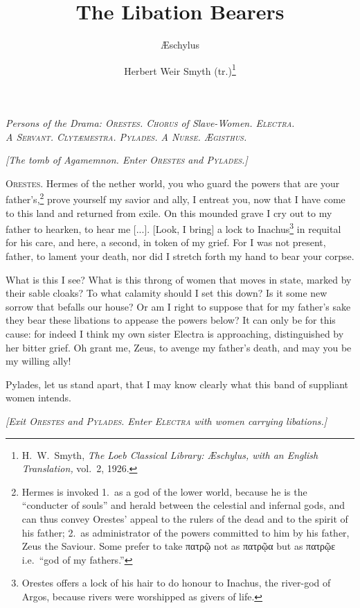 \documentclass[12pt]{article}
\title{The Libation Bearers}
\author{{\AE}schylus \and Herbert Weir Smyth (tr.)\footnote{H.~W.~Smyth, \textit{The Loeb Classical Library: {\AE}schylus, with an English Translation,} vol.~2, 1926.}}
\date{}
\begin{document}
\maketitle

\begin{center}
\textit{Persons of the Drama: \textsc{Orestes. Chorus} of Slave-Women. \textsc{Electra.}\\
A \textsc{Servant. Clyt{\ae}mestra. Pylades.} A \textsc{Nurse. {\AE}gisthus.}}
\end{center}

\begin{center}
\textit{[The tomb of Agamemnon. Enter \textsc{Orestes} and \textsc{Pylades}.]}
\end{center}

\noindent \textsc{Orestes.} Hermes of the nether world, you who guard the powers that are your father's,\footnote{Hermes is invoked 1.~as a god of the lower world, because he is the ``conducter of souls'' and herald between the celestial and infernal gods, and can thus convey Orestes' appeal to the rulers of the dead and to the spirit of his father; 2.~as administrator of the powers committed to him by his father, Zeus the Saviour. Some prefer to take πατρῷ not as πατρῷα but as πατρῷε i.e.~``god of my fathers.''} prove yourself my savior and ally, I entreat you, now that I have come to this land and returned from exile. On this mounded grave I cry out to my father to hearken, to hear me [...]. [Look, I bring] a lock to Inachus\footnote{Orestes offers a lock of his hair to do honour to Inachus, the river-god of Argos, because rivers were worshipped as givers of life.} in requital for his care, and here, a second, in token of my grief. For I was not present, father, to lament your death, nor did I stretch forth my hand to bear your corpse.

What is this I see? What is this throng of women that moves in state, marked by their sable cloaks? To what calamity should I set this down? Is it some new sorrow that befalls our house? Or am I right to suppose that for my father's sake they bear these libations to appease the powers below? It can only be for this cause: for indeed I think my own sister Electra is approaching, distinguished by her bitter grief. Oh grant me, Zeus, to avenge my father's death, and may you be my willing ally!

Pylades, let us stand apart, that I may know clearly what this band of suppliant women intends.

\begin{center}
\textit{[Exit \textsc{Orestes} and \textsc{Pylades}. Enter \textsc{Electra} with women carrying libations.]}
\end{center}
\end{document}
